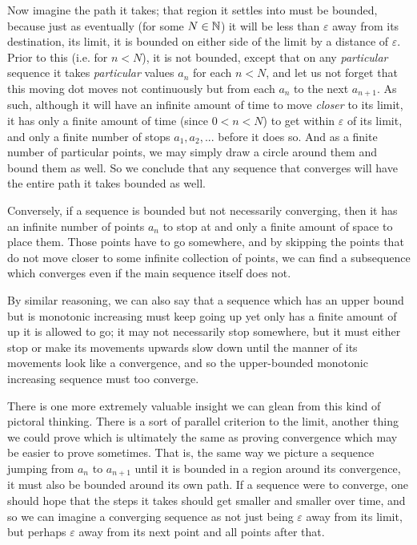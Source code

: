 \documentclass[11pt]{article}
\begin{document}
Now imagine the path it takes; that region it settles into must be bounded, because just as eventually (for some $N\in \mathbb{N}$) it will be less than $\varepsilon$ away from its destination, its limit, it is bounded on either side of the limit by a distance of $\varepsilon$. Prior to this (i.e. for $n < N$), it is not bounded, except that on any \emph{particular} sequence it takes \emph{particular} values $a_n$ for each $n < N$, and let us not forget that this moving dot moves not continuously but from each $a_n$ to the next $a_{n+1}$. As such, although it will have an infinite amount of time to move \emph{closer} to its limit, it has only a finite amount of time (since $0 < n < N$) to get within $\varepsilon$ of its limit, and only a finite number of stops $a_1, a_2, ...$ before it does so. And as a finite number of particular points, we may simply draw a circle around them and bound them as well. So we conclude that any sequence that converges will have the entire path it takes bounded as well.

Conversely, if a sequence is bounded but not necessarily converging, then it has an infinite number of points $a_n$ to stop at and only a finite amount of space to place them. Those points have to go somewhere, and by skipping the points that do not move closer to some infinite collection of points, we can find a subsequence which converges even if the main sequence itself does not.

By similar reasoning, we can also say that a sequence which has an upper bound but is monotonic increasing must keep going up yet only has a finite amount of up it is allowed to go; it may not necessarily stop somewhere, but it must either stop or make its movements upwards slow down until the manner of its movements look like a convergence, and so the upper-bounded monotonic increasing sequence must too converge.

There is one more extremely valuable insight we can glean from this kind of pictoral thinking. There is a sort of parallel criterion to the limit, another thing we could prove which is ultimately the same as proving convergence which may be easier to prove sometimes. That is, the same way we picture a sequence jumping from $a_n$ to $a_{n+1}$ until it is bounded in a region around its convergence, it must also be bounded around its own path. If a sequence were to converge, one should hope that the steps it takes should get smaller and smaller over time, and so we can imagine a converging sequence as not just being $\varepsilon$ away from its limit, but perhaps $\varepsilon$ away from its next point and all points after that.
\end{document}
